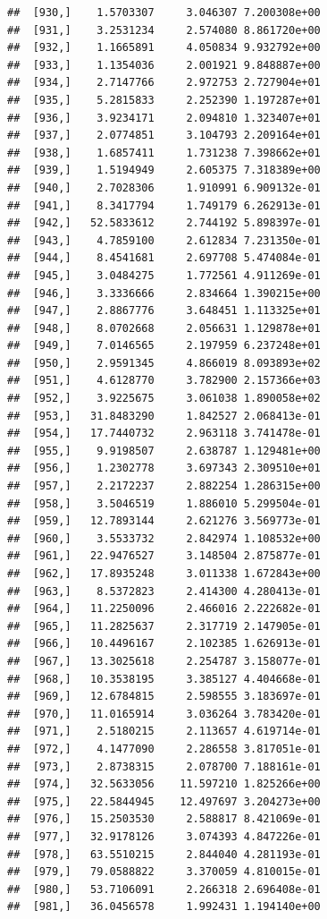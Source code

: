 \documentclass[article]{jss}\usepackage[]{graphicx}\usepackage[]{xcolor}
\makeatletter
\newenvironment{kframe}{%
 \def\at@end@of@kframe{}%
 \ifinner\ifhmode%
  \def\at@end@of@kframe{\end{minipage}}%
  \begin{minipage}{\columnwidth}%
 \fi\fi%
 \def\FrameCommand##1{\hskip\@totalleftmargin \hskip-\fboxsep
 \colorbox{shadecolor}{##1}\hskip-\fboxsep
     \hskip-\linewidth \hskip-\@totalleftmargin \hskip\columnwidth}%
 \MakeFramed {\advance\hsize-\width
   \@totalleftmargin\z@ \linewidth\hsize
   \@setminipage}}%
 {\par\unskip\endMakeFramed%
 \at@end@of@kframe}
\newenvironment{knitrout}{}{} %
\makeatother
\begin{document}
\begin{knitrout}
\begin{kframe}
\begin{verbatim}
##  [930,]    1.5703307     3.046307 7.200308e+00
##  [931,]    3.2531234     2.574080 8.861720e+00
##  [932,]    1.1665891     4.050834 9.932792e+00
##  [933,]    1.1354036     2.001921 9.848887e+00
##  [934,]    2.7147766     2.972753 2.727904e+01
##  [935,]    5.2815833     2.252390 1.197287e+01
##  [936,]    3.9234171     2.094810 1.323407e+01
##  [937,]    2.0774851     3.104793 2.209164e+01
##  [938,]    1.6857411     1.731238 7.398662e+01
##  [939,]    1.5194949     2.605375 7.318389e+00
##  [940,]    2.7028306     1.910991 6.909132e-01
##  [941,]    8.3417794     1.749179 6.262913e-01
##  [942,]   52.5833612     2.744192 5.898397e-01
##  [943,]    4.7859100     2.612834 7.231350e-01
##  [944,]    8.4541681     2.697708 5.474084e-01
##  [945,]    3.0484275     1.772561 4.911269e-01
##  [946,]    3.3336666     2.834664 1.390215e+00
##  [947,]    2.8867776     3.648451 1.113325e+01
##  [948,]    8.0702668     2.056631 1.129878e+01
##  [949,]    7.0146565     2.197959 6.237248e+01
##  [950,]    2.9591345     4.866019 8.093893e+02
##  [951,]    4.6128770     3.782900 2.157366e+03
##  [952,]    3.9225675     3.061038 1.890058e+02
##  [953,]   31.8483290     1.842527 2.068413e-01
##  [954,]   17.7440732     2.963118 3.741478e-01
##  [955,]    9.9198507     2.638787 1.129481e+00
##  [956,]    1.2302778     3.697343 2.309510e+01
##  [957,]    2.2172237     2.882254 1.286315e+00
##  [958,]    3.5046519     1.886010 5.299504e-01
##  [959,]   12.7893144     2.621276 3.569773e-01
##  [960,]    3.5533732     2.842974 1.108532e+00
##  [961,]   22.9476527     3.148504 2.875877e-01
##  [962,]   17.8935248     3.011338 1.672843e+00
##  [963,]    8.5372823     2.414300 4.280413e-01
##  [964,]   11.2250096     2.466016 2.222682e-01
##  [965,]   11.2825637     2.317719 2.147905e-01
##  [966,]   10.4496167     2.102385 1.626913e-01
##  [967,]   13.3025618     2.254787 3.158077e-01
##  [968,]   10.3538195     3.385127 4.404668e-01
##  [969,]   12.6784815     2.598555 3.183697e-01
##  [970,]   11.0165914     3.036264 3.783420e-01
##  [971,]    2.5180215     2.113657 4.619714e-01
##  [972,]    4.1477090     2.286558 3.817051e-01
##  [973,]    2.8738315     2.078700 7.188161e-01
##  [974,]   32.5633056    11.597210 1.825266e+00
##  [975,]   22.5844945    12.497697 3.204273e+00
##  [976,]   15.2503530     2.588817 8.421069e-01
##  [977,]   32.9178126     3.074393 4.847226e-01
##  [978,]   63.5510215     2.844040 4.281193e-01
##  [979,]   79.0588822     3.370059 4.810015e-01
##  [980,]   53.7106091     2.266318 2.696408e-01
##  [981,]   36.0456578     1.992431 1.194140e+00

\end{verbatim}
\end{kframe}
\end{knitrout}
\end{document}
